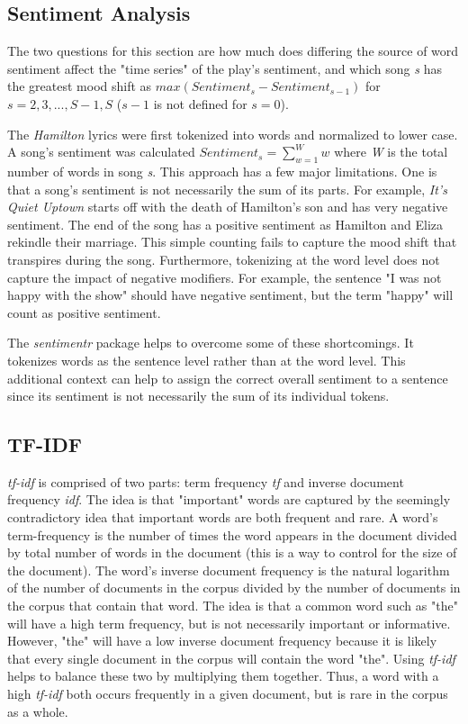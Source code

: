 \documentclass{article}
\begin{document}
\subsection{Sentiment Analysis}

The two questions for this section are how much does differing the source of word sentiment affect the "time series" of the play's sentiment, and which song \emph{s} has the greatest mood shift as $max(Sentiment_{s} - Sentiment_{s - 1})$ for $s = 2, 3, ..., S - 1, S$ ($s - 1$ is not defined for $s = 0$).

The \emph{Hamilton} lyrics were first tokenized into words and normalized to lower case. A song's sentiment was calculated $Sentiment_{s} = \sum_{w = 1}^{W}w$ where \emph{W} is the total number of words in song \emph{s}. This approach has a few major limitations. One is that a song's sentiment is not necessarily the sum of its parts. For example, \emph{It's Quiet Uptown} starts off with the death of Hamilton's son and has very negative sentiment. The end of the song has a positive sentiment as Hamilton and Eliza rekindle their marriage. This simple counting fails to capture the mood shift that transpires during the song. Furthermore, tokenizing at the word level does not capture the impact of negative modifiers. For example, the sentence "I was not happy with the show" should have negative sentiment, but the term "happy" will count as positive sentiment.

The \emph{sentimentr} package helps to overcome some of these shortcomings. It tokenizes words as the sentence level rather than at the word level. This additional context can help to assign the correct overall sentiment to a sentence since its sentiment is not necessarily the sum of its individual tokens. 

\subsection{TF-IDF}
\label{section:tf-idf}

\emph{tf-idf} is comprised of two parts: term frequency \emph{tf} and inverse document frequency \emph{idf}. The idea is that "important" words are captured by the seemingly contradictory idea that important words are both frequent and rare. A word's term-frequency is the number of times the word appears in the document divided by total number of words in the document (this is a way to control for the size of the document). The word's inverse document frequency is the natural logarithm of the number of documents in the corpus divided by the number of documents in the corpus that contain that word. The idea is that a common word such as "the" will have a high term frequency, but is not necessarily important or informative. However, "the" will have a low inverse document frequency because it is likely that every single document in the corpus will contain the word "the". Using \emph{tf-idf} helps to balance these two by multiplying them together. Thus, a word with a high \emph{tf-idf} both occurs frequently in a given document, but is rare in the corpus as a whole. 
\end{document}
